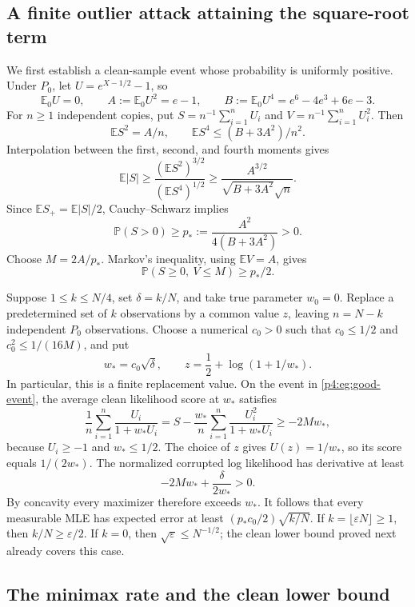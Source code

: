 \documentclass[11pt,a4paper]{article}
\theoremstyle{definition}
\theoremstyle{remark}
\numberwithin{equation}{section}
\begin{document}
\subsection{A finite outlier attack attaining the square-root term}

We first establish a clean-sample event whose probability is uniformly
positive. Under $P_0$, let $U=e^{X-1/2}-1$, so
\[
 \mathbb E_0U=0,\qquad A:=\mathbb E_0U^2=e-1,\qquad
 B:=\mathbb E_0U^4=e^6-4e^3+6e-3.
\]
For $n\ge1$ independent copies, put
$S=n^{-1}\sum_{i=1}^n U_i$ and $V=n^{-1}\sum_{i=1}^nU_i^2$.
Then
\[
 \mathbb ES^2=A/n,\qquad
 \mathbb ES^4\le (B+3A^2)/n^2.
\]
Interpolation between the first, second, and fourth moments gives
\[
 \mathbb E|S|\ge
 \frac{(\mathbb ES^2)^{3/2}}{(\mathbb ES^4)^{1/2}}
 \ge\frac{A^{3/2}}{\sqrt{B+3A^2}\sqrt n}.
\]
Since $\mathbb ES_+=\mathbb E|S|/2$, Cauchy--Schwarz implies
\[
 \mathbb P(S>0)\ge p_*:=\frac{A^2}{4(B+3A^2)}>0.
\]
Choose $M=2A/p_*$. Markov's inequality, using $\mathbb EV=A$, gives
\begin{equation}\label{p4:eg:good-event}
 \mathbb P(S\ge0,\ V\le M)\ge p_*/2.
\end{equation}

Suppose $1\le k\le N/4$, set $\delta=k/N$, and take true parameter
$w_0=0$. Replace a predetermined set of $k$ observations by a common
value $z$, leaving $n=N-k$ independent $P_0$ observations.
Choose a numerical $c_0>0$ such that
$c_0\le1/2$ and $c_0^2\le1/(16M)$, and put
\begin{equation}\label{p4:eg:outlier}
 w_*=c_0\sqrt\delta,\qquad
 z=\frac12+\log(1+1/w_*).
\end{equation}
In particular, this is a finite replacement value. On the event in
\eqref{p4:eg:good-event}, the average clean likelihood score at $w_*$
satisfies
\[
 \frac1n\sum_{i=1}^n\frac{U_i}{1+w_*U_i}
 =S-\frac{w_*}{n}\sum_{i=1}^n\frac{U_i^2}{1+w_*U_i}
 \ge-2Mw_*,
\]
because $U_i\ge-1$ and $w_*\le1/2$.
The choice of $z$ gives $U(z)=1/w_*$, so its score equals
$1/(2w_*)$. The normalized corrupted log likelihood has derivative
at least
\[
 -2Mw_*+\frac{\delta}{2w_*}>0.
\]
By concavity every maximizer therefore exceeds $w_*$.
It follows that every measurable MLE has expected error at least
$(p_*c_0/2)\sqrt{k/N}$. If $k=\lfloor\varepsilon N\rfloor\ge1$,
then $k/N\ge\varepsilon/2$. If $k=0$, then
$\sqrt\varepsilon\le N^{-1/2}$; the clean lower bound proved next
already covers this case.

\subsection{The minimax rate and the clean lower bound}
\end{document}
